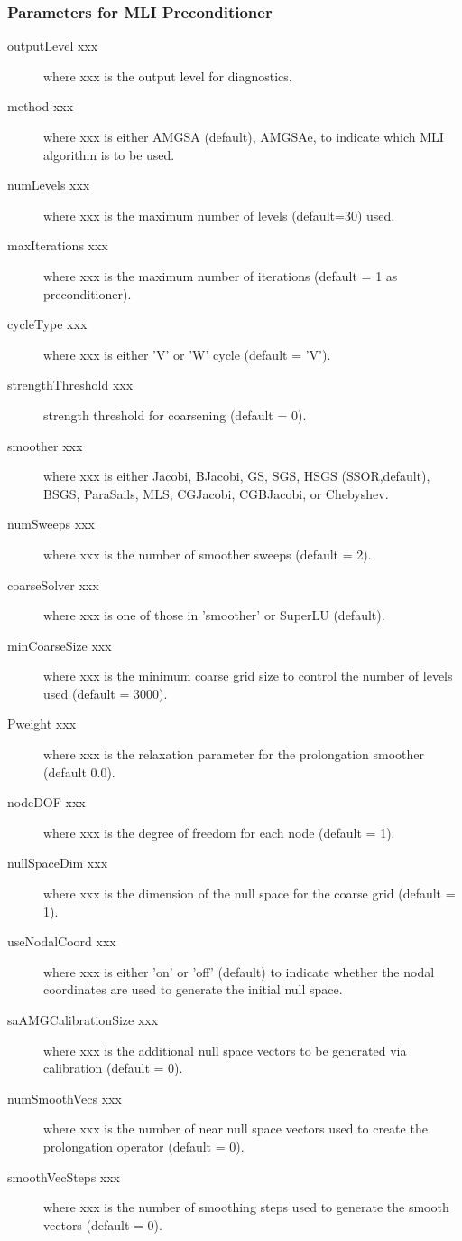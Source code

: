 \subsubsection{Parameters for MLI Preconditioner}

\begin{description}
\item[outputLevel xxx] where xxx is the output level for diagnostics.
\item[method xxx] where xxx is either {\sf AMGSA} (default), {\sf AMGSAe},
     to indicate which MLI algorithm is to be used.
\item[numLevels xxx] where xxx is the maximum number of levels (default=30)
                     used.
\item[maxIterations xxx] where xxx is the maximum number of iterations
                         (default = 1 as preconditioner).
\item[cycleType xxx] where xxx is either 'V' or 'W' cycle (default = 'V').
\item[strengthThreshold xxx] strength threshold for coarsening (default = 0).
\item[smoother xxx] where xxx is either {\sf Jacobi}, {\sf BJacobi}, {\sf GS}, 
     {\sf SGS}, {\sf HSGS} (SSOR,default), {\sf BSGS}, {\sf ParaSails}, 
     {\sf MLS}, {\sf CGJacobi}, {\sf CGBJacobi}, or {\sf Chebyshev}.
\item[numSweeps xxx] where xxx is the number of smoother sweeps (default = 2).
\item[coarseSolver xxx] where xxx is one of those in 'smoother' or
     {\sf SuperLU} (default).
\item[minCoarseSize xxx] where xxx is the minimum coarse grid size to
     control the number of levels used (default = 3000).
\item[Pweight xxx] where xxx is the relaxation parameter for the prolongation
     smoother (default 0.0).
\item[nodeDOF xxx] where xxx is the degree of freedom for each node
                   (default = 1).
\item[nullSpaceDim xxx] where xxx is the dimension of the null space for
     the coarse grid (default = 1).
\item[useNodalCoord xxx] where xxx is either 'on' or 'off' (default)
     to indicate whether the nodal coordinates are used to generate the 
     initial null space.
\item[saAMGCalibrationSize xxx] where xxx is the additional null space 
     vectors to be generated via calibration (default = 0).
\item[numSmoothVecs xxx] where xxx is the number of near null space 
     vectors used to create the prolongation operator (default = 0).
\item[smoothVecSteps xxx] where xxx is the number of smoothing steps
     used to generate the smooth vectors (default = 0).
\end{description}


